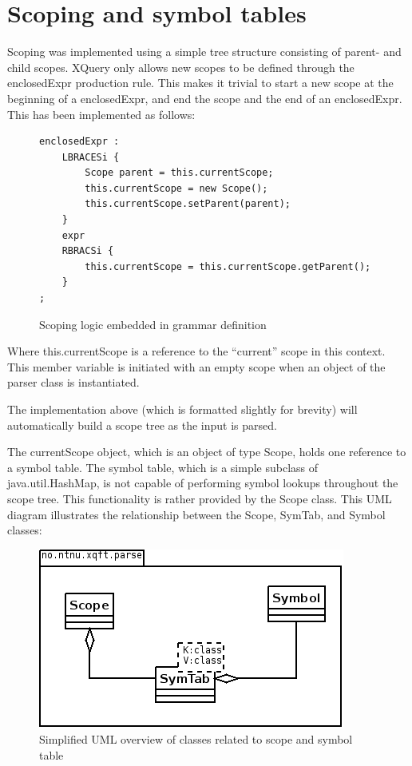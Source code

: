 \section{Scoping and symbol tables}
Scoping was implemented using a simple tree structure consisting of parent- and
child scopes. XQuery only allows new scopes to be defined through the
enclosedExpr production rule. This makes it trivial to start a new scope at the
beginning of a enclosedExpr, and end the scope and the end of an enclosedExpr.
This has been implemented as follows:
\begin{figure}[!h]
\begin{verbatim}
enclosedExpr : 
    LBRACESi {
        Scope parent = this.currentScope; 
        this.currentScope = new Scope(); 
        this.currentScope.setParent(parent); 
    }
    expr 
    RBRACSi { 
        this.currentScope = this.currentScope.getParent(); 
    }
;
\end{verbatim}
\caption{Scoping logic embedded in grammar definition}
\end{figure}

Where this.currentScope is a reference to the ``current'' scope in this
context. This member variable is initiated with an empty scope when an object
of the parser class is instantiated.

The implementation above (which is formatted slightly for brevity) will
automatically build a scope tree as the input is parsed.

The currentScope object, which is an object of type Scope, holds one reference
to a symbol table. The symbol table, which is a simple subclass of
java.util.HashMap, is not capable of performing symbol lookups throughout the
scope tree. This functionality is rather provided by the Scope class. This UML diagram
illustrates the relationship between the Scope, SymTab, and Symbol classes:
\begin{figure}[!h]
  \centering
    \includegraphics[scale=0.8]{img/uml1}
  \caption{Simplified UML overview of classes related to scope and symbol table}
\end{figure}

